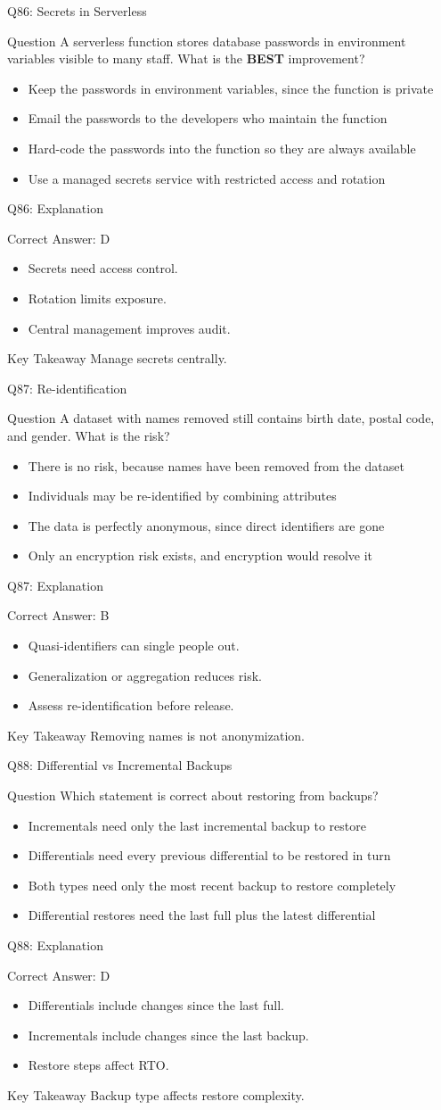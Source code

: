 \documentclass[aspectratio=169]{beamer}
\newcommand{\hq}[7]{%
	\begin{frame}{Q#1: #2}
		\begin{block}{Question}
			#3
		\end{block}
		\begin{itemize}
			#4
		\end{itemize}
	\end{frame}
	\begin{frame}{Q#1: Explanation}
		\begin{block}{Correct Answer: #5}
			\begin{itemize}
				#6
			\end{itemize}
		\end{block}
		\begin{alertblock}{Key Takeaway}
			#7
		\end{alertblock}
	\end{frame}
}
\begin{document}
	\hq{86}{Secrets in Serverless}
	{A serverless function stores database passwords in environment variables visible to many staff. What is the \textbf{BEST} improvement?}
	{\item[\textbf{(A)}] Keep the passwords in environment variables, since the function is private
		\item[\textbf{(B)}] Email the passwords to the developers who maintain the function
		\item[\textbf{(C)}] Hard-code the passwords into the function so they are always available
		\item[\textbf{(D)}] Use a managed secrets service with restricted access and rotation}
	{D}
	{\item Secrets need access control.
		\item Rotation limits exposure.
		\item Central management improves audit.}
	{Manage secrets centrally.}

	\hq{87}{Re-identification}
	{A dataset with names removed still contains birth date, postal code, and gender. What is the risk?}
	{\item[\textbf{(A)}] There is no risk, because names have been removed from the dataset
		\item[\textbf{(B)}] Individuals may be re-identified by combining attributes
		\item[\textbf{(C)}] The data is perfectly anonymous, since direct identifiers are gone
		\item[\textbf{(D)}] Only an encryption risk exists, and encryption would resolve it}
	{B}
	{\item Quasi-identifiers can single people out.
		\item Generalization or aggregation reduces risk.
		\item Assess re-identification before release.}
	{Removing names is not anonymization.}

	\hq{88}{Differential vs Incremental Backups}
	{Which statement is correct about restoring from backups?}
	{\item[\textbf{(A)}] Incrementals need only the last incremental backup to restore
		\item[\textbf{(B)}] Differentials need every previous differential to be restored in turn
		\item[\textbf{(C)}] Both types need only the most recent backup to restore completely
		\item[\textbf{(D)}] Differential restores need the last full plus the latest differential}
	{D}
	{\item Differentials include changes since the last full.
		\item Incrementals include changes since the last backup.
		\item Restore steps affect RTO.}
	{Backup type affects restore complexity.}
\end{document}
